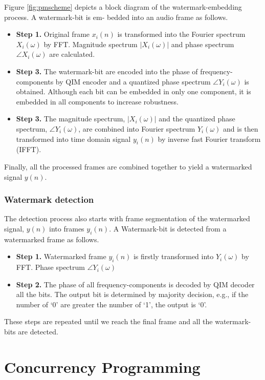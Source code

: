 Figure \ref{fig:pmscheme} depicts a block diagram of the watermark-embedding process. A watermark-bit is em-
bedded into an audio frame as follows.
\begin{itemize}
\item{\textbf{Step 1.}} Original frame \(x_i(n)\) is transformed into the Fourier spectrum \(X_i(\omega)\) by FFT.
Magnitude spectrum \(|X_i(\omega)|\) and phase spectrum \(\angle X_i(\omega)\) are calculated.
\item{\textbf{Step 3.}} The watermark-bit are encoded into the phase of frequency-components by
QIM encoder and a quantized phase spectrum \(\angle Y_i(\omega)\) is obtained. Although each bit
can be embedded in only one component, it is embedded in all components to increase
robustness.
\item{\textbf{Step 3.}} The magnitude spectrum, \(|X_i(\omega)|\) and the quantized phase spectrum, \(\angle Y_i(\omega)\),
are combined into Fourier spectrum \(Y_i(\omega)\) and is then transformed into time domain signal
\(y_i(n)\) by inverse fast Fourier transform (IFFT).

\end{itemize}
Finally, all the processed frames are combined together to yield a watermarked signal
\(y(n)\).

\subsubsection*{Watermark detection}
The detection process also starts with frame segmentation of the watermarked signal,
\(y(n)\) into frames \(y_i(n)\). A Watermark-bit is detected from a watermarked frame as follows.

\begin{itemize}
\item{\textbf{Step 1.}} Watermarked frame \(y_i(n)\) is firstly transformed into \(Y_i(\omega)\) by FFT. Phase spectrum \(\angle Y_i(\omega)\)

\item{\textbf{Step 2.}} The phase of all frequency-components is decoded by QIM decoder all the bits. The output bit is determined by majority decision, e.g., if the number of `0' are greater the number of `1', the output is `0'.
\end{itemize}

These steps are repeated until we reach the final frame and all the watermark-bits are detected.
\section{Concurrency Programming}
